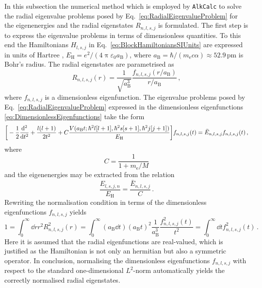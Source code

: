 \documentclass[fontsize=12pt,
               twoside=false,
               BCOR=0mm,
               DIV=14,
               overfullrule=false, %
               toc=bibliography,
               headinclude=true,
               footinclude=false]{scrartcl}
\numberwithin{equation}{section}
\newcommand{\pii}{\uppi}
\newcommand{\aB}{a_\mathrm{B}}
\newcommand{\me}{m_\mathrm{e}}
\newcommand{\EH}{E_\mathrm{H}}
\newcommand{\alkcalc}{\texttt{AlkCalc} }
\begin{document}
    In this subsection the numerical method which is employed by \alkcalc to
    solve the radial eigenvalue problems posed by
    Eq.~\eqref{eq:RadialEigenvalueProblem} for the eigenenergies and the radial
    eigenstates $R_{n,l,s,j}$ is formulated. The first step is to express the
    eigenvalue problems in terms of dimensionless quantities. To this end the
    Hamiltonians $H_{l,s,j}$ in Eq.~\eqref{eq:BlockHamiltoniansSIUnits} are
    expressed in units of Hartree \cite{friedrich2017},
    $E_\mathrm{H}=e^2\slash{(4\pii\varepsilon_0a_\mathrm{B})}$, where
    $a_\mathrm{B}=\hbar\slash{(m_\mathrm{e}c\alpha)}\approx52.9\,\mathrm{pm}$ is
    Bohr's radius. The radial eigenstates are parametrised as
    \begin{equation}\label{eq:DimensionlessEigenfunctions}
        R_{n,l,s,j}(r)
        =
        \frac{1}{\sqrt{\aB^3}}\frac{f_{n,l,s,j}(r\slash\aB)}{r\slash\aB}
        \,,
    \end{equation}
    where $f_{n,l,s,j}$ is a dimensionless eigenfunction. The eigenvalue
    problems posed by Eq.~\eqref{eq:RadialEigenvalueProblem} expressed in the
    dimensionless eigenfunctions \eqref{eq:DimensionlessEigenfunctions} take the
    form
    \begin{equation}\label{eq:DimensionlessEigenproblem}
        \bigg[
        -
        \frac{1}{2}
        \dv[2]{t}
        +\frac{l(l+1)}{2t^2}
        +C\frac{V(\aB{t};\hbar^2l[l+1],\hbar^2s[s+1],\hbar^2j[j+1])}{\EH}
        \bigg]
        f_{n,l,s,j}(t)
        =
        \bar{E}_{n,l,s,j}
        f_{n,l,s,j}(t)
    \,,
    \end{equation}
    where
    \begin{equation}
        C = \frac{1}{1+\me\slash{M}}
    \end{equation}
    and the eigenenergies may be extracted from the relation
    \begin{equation}
        \frac{E_{l,s,j,n}}{E_\mathrm{H}}
        =
        \frac{\bar{E}_{n,l,s,j}}{C}
    \,.
    \end{equation}
    Rewriting the normalisation condition in terms of the dimensionless
    eigenfunctions $f_{n,l,s,j}$ yields
    \begin{equation}\label{eq:Normalisation}
        1
        =
        \int^\infty_0\dd{r}r^2R^2_{n,l,s,j}(r)
        =
        \int^\infty_0 (\aB\dd{t})(\aB t)^2 \frac{1}{\aB^3}
        \frac{f^2_{n,l,s,j}(t)}{t^2}
        =
        \int^\infty_0\dd{t}f^2_{n,l,s,j}(t)
    \,.
    \end{equation}
    Here it is assumed that the radial eigenfunctions are real-valued, which is
    justified as the Hamiltonian is not only an hermitian but also a symmetric
    operator. In conclusion, normalising the dimensionless eigenfunctions
    $f_{n,l,s,j}$ with respect to the standard one-dimensional $L^2$-norm
    automatically yields the correctly normalised radial eigenstates.
\end{document}
